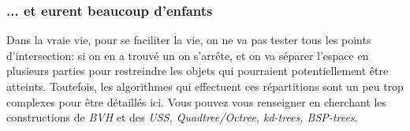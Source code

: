 \documentclass{beamercours}
\begin{document}
\begin{frame}
\frametitle{... et eurent beaucoup d'enfants}
Dans la vraie vie, pour se faciliter la vie, on ne va pas tester tous les points d'intersection: si on en a trouvé un on s'arrête, et on va séparer l'espace en plusieurs parties pour restreindre les objets qui pourraient potentiellement être atteints.
Toutefois, les algorithmes qui effectuent ces répartitions sont un peu trop complexes pour être détaillés ici.
Vous pouvez vous renseigner en cherchant les constructions de \emph{BVH} et des \emph{USS, Quadtree/Octree, kd-trees, BSP-trees}.
\end{frame}
\end{document}
